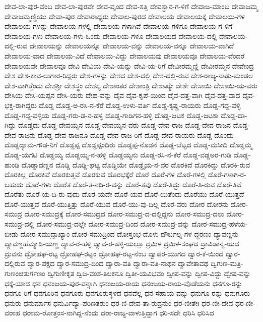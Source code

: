 {ದೇವ-ಲಾ-ಪುರ-ವೆಂಬ
ದೇವ-ಲಾ-ಪುರವೇ
ದೇವ-ವೃಂದ
ದೇವ-ಸತ್ತಿ
ದೇವಸ್ಥಾನ-ಗ-ಳಿಗೆ
ದೇವಾಜ-ಮಾಂಬ
ದೇವಾಜಮ್ಮ
ದೇವಾಜಮ್ಮಣ್ಣಿಯು
ದೇವಾ-ಪುರ
ದೇವಾರಾಧ್ಯರು
ದೇವಾಲ-ಪುರದ
ದೇವಾಲಯ
ದೇವಾಲಯಕ್ಕೆ
ದೇವಾಲಯ-ಗಳ
ದೇವಾಲಯ-ಗಳನ್ನು
ದೇವಾಲಯ-ಗಳಲ್ಲಿ
ದೇವಾಲಯ-ಗಳಾಗಿವೆ
ದೇವಾಲಯ-ಗಳಿಗೂ
ದೇವಾಲಯ-ಗ-ಳಿಗೆ
ದೇವಾಲಯ-ಗಳು
ದೇವಾಲಯ-ಗಳು-ಒಂದು
ದೇವಾಲಯ-ಗಳೂ
ದೇವಾಲಯದ
ದೇವಾಲಯ-ದಲ್ಲಿ
ದೇವಾಲಯ-ದಲ್ಲಿ-ರುವ
ದೇವಾಲಯನ್ನು
ದೇವಾಲಯನ್ನೂ
ದೇವಾಲಯ-ವನ್ನು
ದೇವಾಲಯ-ವನ್ನೂ
ದೇವಾಲಯ-ವಾಗಿದೆ
ದೇವಾಲಯ-ವಾದ
ದೇವಾಲಯ-ವಿದೆ
ದೇವಾಲಯ-ವಿದ್ದು
ದೇವಾಲಯವು
ದೇವಾಲಯವೂ
ದೇವಾಲಯ-ವೆಂದರೆ
ದೇವಾಲಯವೇ
ದೇವಾಲವೂ
ದೇವಿ
ದೇವಿಯ
ದೇವಿ-ಯನ್ನು
ದೇವಿ-ಯ-ರಿಗೆ
ದೇವೀರಮ್ಮಣ್ಣಿ
ದೇವೀರಮ್ಮನ
ದೇವೇಂದ್ರ
ದೇಶ
ದೇಶ-ಕಾವ-ಲುಗಾರ-ರಿದ್ದರು
ದೇಶ-ಗಳನ್ನು
ದೇಶದ
ದೇಶ-ದಲ್ಲಿ
ದೇಶ-ದಲ್ಲಿ-ರುವ
ದೇಶ-ರಾಜ್ಯ-ನಾಡು-ಮಂಡಲ
ದೇಶ-ವಾಗಿತ್ತೆಂದು
ದೇಶಶ್ರೀ
ದೇಶಸ್ಥಂ
ದೇಶಸ್ಯ
ದೇಶಾಂತರ
ದೇಶಾಂತ್ರಿ
ದೇಶಾಖ್ಯೇ
ದೇಶೇ
ದೇಸಾಯಿ
ದೇಸಾಯಿ-ಯ-ವರು
ದೇಸಿಯ
ದೇಸಿ-ಯಪ್ಪನ
ದೇಸಿ-ಯರು
ದೇಹ-ವನ್ನು
ದೈವ
ದೈವ-ಕೃಪೆ-ಯಿಂದ
ದೈವ-ದತ್ತ-ವಾಗಿ
ದೈವ-ದತ್ತ-ವಾದ
ದೈವ-ಭಕ್ತ-ರಾಗಿದ್ದರು
ದೊಡ್ಡ
ದೊಡ್ಡ-ಅ-ರಸಿ-ನ-ಕೆರೆ
ದೊಡ್ಡ-ಉಳು-ವರ್ತಿ
ದೊಡ್ಡ-ಕೃಷ್ಣ-ರಾಯರು
ದೊಡ್ಡ-ಗದ್ದ-ವಳ್ಳಿ
ದೊಡ್ಡ-ಗದ್ದ-ವಳ್ಳಿಯ
ದೊಡ್ಡ-ಗರು-ಡ-ನ-ಹಳ್ಳಿ
ದೊಡ್ಡ-ಗಾಡಿಗನ-ಹಳ್ಳಿ
ದೊಡ್ಡ-ಜಟಕ
ದೊಡ್ಡ-ಜಟಕಾ
ದೊಡ್ಡ-ದಾ-ಗಿದ್ದು
ದೊಡ್ಡದು
ದೊಡ್ಡ-ದೇವಯ್ಯನ
ದೊಡ್ಡ-ದೇವಯ್ಯನ-ವರು
ದೊಡ್ಡ-ದೇವ-ರಾಜ
ದೊಡ್ಡ-ದೇವ-ರಾಜನ
ದೊಡ್ಡ-ದೇವ-ರಾಜನು
ದೊಡ್ಡ-ದೇವ-ರಾಜನೂ
ದೊಡ್ಡ-ದೇವ-ರಾಜ-ರಿಗೆ
ದೊಡ್ಡ-ದೇವ-ರಾಯರು
ದೊಡ್ಡ-ದೊಂದು
ದೊಡ್ಡದ್ಯಾಮ-ಗೌಡ-ನಿಗೆ
ದೊಡ್ಡಪ್ಪ
ದೊಡ್ಡಪ್ಪಂದಿರು
ದೊಡ್ಡಪ್ಪ-ನೊಡನೆ
ದೊಡ್ಡ-ಬೆಟ್ಟದ
ದೊಡ್ಡ-ಮಸೀದಿ
ದೊಡ್ಡಮ್ಮ
ದೊಡ್ಡ-ಯಗಟಿ
ದೊಡ್ಡಯ್ಯ
ದೊಡ್ಡಯ್ಯ-ನ-ಹಳ್ಳಿ
ದೊಡ್ಡಯ್ಯನು
ದೊಡ್ಡ-ರಸಿ-ನ-ಕೆರೆ
ದೊಡ್ಡ-ವಡ್ಡಅರ-ಗುಡಿ
ದೊಡ್ಡ-ಹುಂಡಿ
ದೊಡ್ಡಾದಣ್ಣನ
ದೊಡ್ಡಿ
ದೊಡ್ಡಿ-ಘಟ್ಟ
ದೊಡ್ಡಿಯೇ
ದೊಡ್ಡೈಯ-ನ-ವರ
ದೊರಕಿದೆ
ದೊರಕಿದ್ದು
ದೊರಕಿ-ರುವ
ದೊರಕಿಲ್ಲ
ದೊರಕಿವೆ
ದೊರಕುತ್ತವೆ
ದೊರಕುವ
ದೊರಭಕ್ಕೆರೆ
ದೊರೆ
ದೊರೆ-ಗಳ
ದೊರೆ-ಗಳಲ್ಲಿ
ದೊರೆ-ಗಳಾಗಿ-ರ-ಬಹುದು
ದೊರೆ-ಗಳು
ದೊರೆತ
ದೊರೆ-ತ-ನದಿ-ರ-ವನ್ನು
ದೊರೆ-ತವು
ದೊರೆ-ತಿದ್ದು
ದೊರೆ-ತಿ-ರುವ
ದೊರೆ-ತಿವೆ
ದೊರೆತು
ದೊರೆ-ಯ-ದಿ-ರು-ವುದು
ದೊರೆ-ಯದೇ
ದೊರೆ-ಯವ
ದೊರೆ-ಯಿತೆಂದು
ದೊರೆಯು
ದೊರೆ-ಯುತ್ತದೆ
ದೊರೆ-ಯುತ್ತವೆ
ದೊರೆ-ಯುತ್ತಿತ್ತು
ದೊರೆ-ಯುವ
ದೊರೆ-ಯು-ವು-ದಿಲ್ಲ
ದೊರೆ-ವರು
ದೋರ
ದೋರನು
ದೋರ-ಸಮುದ್ರ
ದೋರ-ಸಮುದ್ರಕ್ಕೆ
ದೋರ-ಸಮುದ್ರದ
ದೋರ-ಸಮುದ್ರ-ದ-ದಲ್ಲಿದ್ದನು
ದೋರ-ಸಮುದ್ರ-ದಲು
ದೋರ-ಸಮುದ್ರ-ದಲ್ಲಿ
ದೋರ-ಸಮುದ್ರ-ದಲ್ಲೇ
ದೋರ-ಸಮುದ್ರ-ದಿಂದ
ದೋರ-ಸಮುದ್ರ-ವನ್ನು
ದೋರ-ಸಮುದ್ರ-ಹಳೆಯ-ಬೀಡು
ದೋರ-ಸಮುದ್ರಾಖ್ಯಾಂ
ದೋರ-ಸಮುದ್ರಿಂದ
ದೋಸ್ತಂಭ-ದೊಳು
ದೌರ್ಬಲ್ಯ-ಗಳ
ದ್ಧರಣಂ
ದ್ಯಾವಣ್ಣನು
ದ್ಯಾವಣ್ಣಹೆಮ್ಮಾಡಿ-ಯಣ್ಣ
ದ್ಯಾವ-ರ-ಹಳ್ಳಿ
ದ್ಯಾವ-ರ-ಹಳ್ಳಿ-ಯಲ್ಲೂ
ದ್ರಮಿಳ
ದ್ರಮಿಳ-ಸಂಘದ
ದ್ರಾವಿಡಾನ್ವ-ಯದ
ದ್ರುವನು
ದ್ರೋಹಘ-ರಟ್ಟ
ದ್ರೋಹಘ-ರಟ್ಟಂ
ದ್ರೋಹಘ-ರಟ್ಟ-ನೆಂಬ
ದ್ವಾಪರ-ಯುಗದ
ದ್ವಾರ-ಕೆ-ಯಿಂದ
ದ್ವಾರ-ದಲ್ಲಿರುವ
ದ್ವಾರ-ಪಕ್ಷದ
ದ್ವಾರ-ಸಮುದ್ರ-ದಿಂದ
ದ್ವಾರಾ-ವತಿ
ದ್ವಾರಾ-ವತಿ-ನಾಥನ
ದ್ವಾವೇತಾವಥ
ದ್ವಿಗುಣ-ಮತ್ರಿ-ಗುಣಂಚತುರ್ಗಣಂ
ದ್ವಿಗುಣೀಕೃತ
ದ್ವಿಜ-ವಂಶ-ತಿಲಕನೂ
ದ್ವಿತೀ-ಯವಿಭವಂ
ದ್ವೀಪ-ವನ್ನು
ದ್ವೀಪ-ವಿದ್ದು
ದ್ವೇಷ-ವನ್ನು
ಧಕ್ಕೆ-ಯಾದ
ಧನ
ಧನಂಜಯ-ಪುರ-ವನ್ನಾಗಿ
ಧನಂಜಯ-ರಾಯ
ಧನಂಜಯ-ರಾಯ-ವೊಡೆಯನು
ಧನಗೂ-ರನ್ನು
ಧನಗೂ-ರಿಗೆ
ಧನಗೂರಿನ
ಧನಗೂರು
ಧನಗೂರುಸ್ಥಳದ
ಧನವೆಲ್ಲ
ಧನ-ಸಹಾಯ-ವನ್ನು
ಧನುಗೂ-ರನ್ನು
ಧನುಗೂರು
ಧನುರು
ಧನುರ್ಮಾಸ
ಧನುರ್ವಿದ್ಯಾ-ಪರಿಣತರುಂ
ಧರ-ಣಿ-ದೇವ-ತಾ-ರುದ್ರನುಂ
ಧರ-ಣೀತೇಃ
ಧರ-ಣೀ-ದೇವ
ಧರ-ಣೀ-ವರಾಹ
ಧರಾಮ-ರೋತ್ತಂಸ-ನಾಗಿದ್ದ-ನೆಂದು
ಧರಾ-ರಾಜ್ಯ-ವಾಳುತ್ತಿದ್ದಾಗ
ಧರಿ-ಸದೇ
ಧರಿಸಿ
ಧರಿಸಿದ
}
